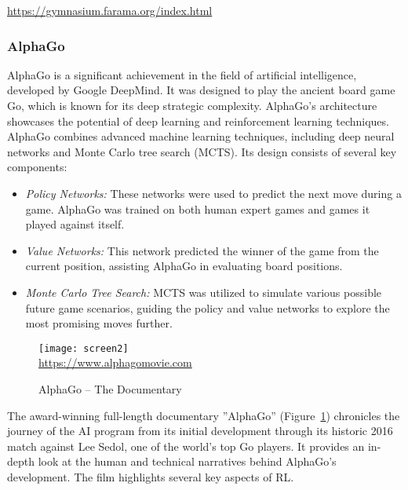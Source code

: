 \begin{resourcebox}
\vspace{\baselineskip}

\small
\url{https://gymnasium.farama.org/index.html}
\normalsize

\vspace{\baselineskip}
\end{resourcebox}

\subsubsection*{AlphaGo}

AlphaGo is a significant achievement in the field of artificial intelligence, developed by Google DeepMind. It was designed to play the ancient board game Go, which is known for its deep strategic complexity.  AlphaGo's architecture showcases the potential of deep learning and reinforcement learning techniques. AlphaGo combines advanced machine learning techniques, including deep neural networks and Monte Carlo tree search (MCTS). Its design consists of several key components:

\begin{itemize}
\item \emph{Policy Networks:} These networks were used to predict the next move during a game. AlphaGo was trained on both human expert games and games it played against itself.
\item \emph{Value Networks:} This network predicted the winner of the game from the current position, assisting AlphaGo in evaluating board positions.
\item \emph{Monte Carlo Tree Search:} MCTS was utilized to simulate various possible future game scenarios, guiding the policy and value networks to explore the most promising moves further.
\end{itemize}

\begin{figure}
\begin{center}
\texttt{[image: screen2]} \\
\footnotesize \url{https://www.alphagomovie.com}
\end{center}
\caption{AlphaGo -- The Documentary}
\label{fig:alphago}
\end{figure}

The award-winning full-length documentary ''AlphaGo'' (Figure~\ref{fig:alphago}) chronicles the journey of the AI program from its initial development through its historic 2016 match against Lee Sedol, one of the world's top Go players. It provides an in-depth look at the human and technical narratives behind AlphaGo's development. The film highlights several key aspects of RL.

